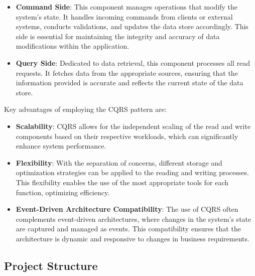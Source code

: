 \begin{itemize}
\item \textbf{Command Side}: This component manages operations that modify the
system's state. It handles incoming commands from clients or external systems,
conducts validations, and updates the data store accordingly. This side is
essential for maintaining the integrity and accuracy of data modifications
within the application.
\item \textbf{Query Side}: Dedicated to data retrieval, this component processes
all read requests. It fetches data from the appropriate sources, ensuring that
the information provided is accurate and reflects the current state of the data
store.
\end{itemize}

Key advantages of employing the CQRS pattern are:

\begin{itemize}
\item \textbf{Scalability}: CQRS allows for the independent scaling of the read
and write components based on their respective workloads, which can
significantly enhance system performance.
\item \textbf{Flexibility}: With the separation of concerns, different storage
and optimization strategies can be applied to the reading and writing processes.
This flexibility enables the use of the most appropriate tools for each
function, optimizing efficiency.
\item \textbf{Event-Driven Architecture Compatibility}: The use of CQRS often
complements event-driven architectures, where changes in the system's state are
captured and managed as events. This compatibility ensures that the architecture
is dynamic and responsive to changes in business requirements.
\end{itemize}

\subsection{Project Structure}

